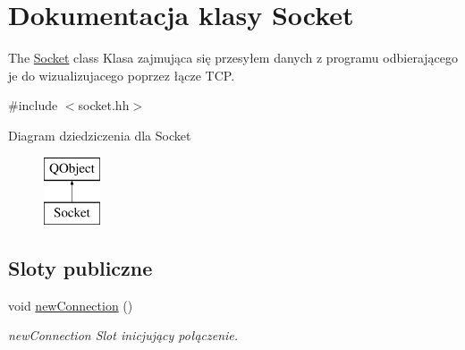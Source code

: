 \hypertarget{class_socket}{\section{Dokumentacja klasy Socket}
\label{class_socket}
}


The \hyperlink{class_socket}{Socket} class Klasa zajmująca się przesyłem danych z programu odbierającego je do wizualizujacego poprzez łącze T\-C\-P.  




{\ttfamily \#include $<$socket.\-hh$>$}

Diagram dziedziczenia dla Socket\begin{figure}[H]
\begin{center}
\leavevmode
\includegraphics[height=2.000000cm]{class_socket}
\end{center}
\end{figure}
\subsection*{Sloty publiczne}
\begin{DoxyCompactItemize}
\item 
\hypertarget{class_socket_ae7f0dec57cf59312e51ad2ba29a66cb3}{void \hyperlink{class_socket_ae7f0dec57cf59312e51ad2ba29a66cb3}{new\-Connection} ()}\label{class_socket_ae7f0dec57cf59312e51ad2ba29a66cb3}

\begin{DoxyCompactList}\small\item\em new\-Connection Slot inicjujący połączenie. \end{DoxyCompactList}\end{DoxyCompactItemize}
